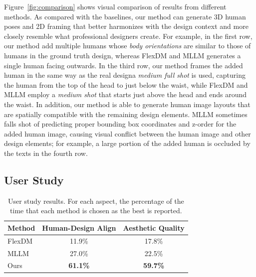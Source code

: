 Figure~\ref{fig:comparison} shows visual comparison of results from different methods. As compared with the baselines, our method can generate 3D human poses and 2D framing that better harmonizes with the design context and more closely resemble what professional designers create. For example, in the first row, our method add multiple humans whose \textit{body orientations} are similar to those of humans in the ground truth design, whereas FlexDM and MLLM generates a single human facing outwards. In the third row, our method frames the added human in the same way as the real design\textemdash a \textit{medium full shot} is used, capturing the human from the top of the head to just below the waist, while FlexDM and MLLM employ a \textit{medium shot} that starts just above the head and ends around the waist. In addition, our method is able to generate human image layouts that are spatially compatible with the remaining design elements. MLLM sometimes falls shot of predicting proper bounding box coordinates and z-order for the added human image, causing visual conflict between the human image and other design elements; for example, a large portion of the added human is occluded by the texts in the fourth row.
    

\subsection{User Study}

\begin{table}[t]
\centering
\caption{User study results. For each aspect, the percentage of the time that each method is chosen as the best is reported.
}
\label{tab:user_study}
\resizebox{0.85\columnwidth}{!}
{
\begin{tabular}{l|cc}
\hline
 Method & Human-Design Align & Aesthetic Quality\\
\hline
FlexDM  & 11.9\% & 17.8\% \\
MLLM &  27.0\% & 22.5\% \\
Ours & \textbf{61.1\%} & \textbf{59.7\%} \\
\hline
\end{tabular}
}
\end{table}

